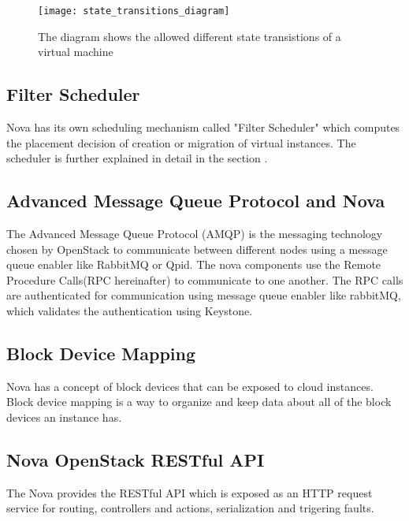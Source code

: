 \begin{figure}[H]
	\begin{center}
		\texttt{[image: state\_transitions\_diagram]}
		\caption{The diagram shows the allowed different state transistions of a virtual machine\cite{OpenStack:state_transitions}}\label{fig:statetransitionsdiagram}
	\end{center}
	\vspace{-10pt}
\end{figure}

\subsection{Filter Scheduler}\label{ssec:filterschedulermin}
Nova has its own scheduling mechanism called "Filter Scheduler" which computes the placement decision of creation or migration of virtual instances.
The scheduler is further explained in detail in the section .

\subsection{Advanced Message Queue Protocol and Nova}\label{ssec:amqpnova}
The Advanced Message Queue Protocol (AMQP) is the messaging technology chosen by OpenStack to communicate between different nodes using a message queue enabler like RabbitMQ or Qpid.
The nova components use the Remote Procedure Calls(RPC hereinafter) to communicate to one another. The RPC calls are authenticated for communication using message queue enabler like rabbitMQ, which validates the authentication using Keystone.

\subsection{Block Device Mapping}\label{ssec:blockdevicemapping}
Nova has a concept of block devices that can be exposed to cloud instances.
Block device mapping is a way to organize and keep data about all of the block devices an instance has.

\subsection{Nova OpenStack RESTful API}\label{ssec:novarestapi}
The Nova provides the RESTful API which is exposed as an HTTP request service for routing, controllers and actions, serialization and trigering faults.

